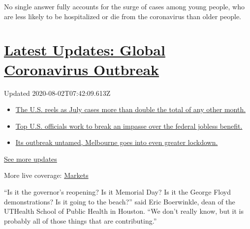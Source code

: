 No single answer fully accounts for the surge of cases among young
people, who are less likely to be hospitalized or die from the
coronavirus than older people.

\hypertarget{latest-updates-global-coronavirus-outbreak}{%
\section{\texorpdfstring{\href{https://www.nytimes.com/2020/08/01/world/coronavirus-covid-19.html?action=click\&pgtype=Article\&state=default\&region=MAIN_CONTENT_1\&context=storylines_live_updates}{Latest
Updates: Global Coronavirus
Outbreak}}{Latest Updates: Global Coronavirus Outbreak}}\label{latest-updates-global-coronavirus-outbreak}}

Updated 2020-08-02T07:42:09.613Z

\begin{itemize}
\tightlist
\item
  \href{https://www.nytimes.com/2020/08/01/world/coronavirus-covid-19.html?action=click\&pgtype=Article\&state=default\&region=MAIN_CONTENT_1\&context=storylines_live_updates\#link-34047410}{The
  U.S. reels as July cases more than double the total of any other
  month.}
\item
  \href{https://www.nytimes.com/2020/08/01/world/coronavirus-covid-19.html?action=click\&pgtype=Article\&state=default\&region=MAIN_CONTENT_1\&context=storylines_live_updates\#link-780ec966}{Top
  U.S. officials work to break an impasse over the federal jobless
  benefit.}
\item
  \href{https://www.nytimes.com/2020/08/01/world/coronavirus-covid-19.html?action=click\&pgtype=Article\&state=default\&region=MAIN_CONTENT_1\&context=storylines_live_updates\#link-2bc8948}{Its
  outbreak untamed, Melbourne goes into even greater lockdown.}
\end{itemize}

\href{https://www.nytimes.com/2020/08/01/world/coronavirus-covid-19.html?action=click\&pgtype=Article\&state=default\&region=MAIN_CONTENT_1\&context=storylines_live_updates}{See
more updates}

More live coverage:
\href{https://www.nytimes.com/live/2020/07/31/business/stock-market-today-coronavirus?action=click\&pgtype=Article\&state=default\&region=MAIN_CONTENT_1\&context=storylines_live_updates}{Markets}

``Is it the governor's reopening? Is it Memorial Day? Is it the George
Floyd demonstrations? Is it going to the beach?'' said Eric Boerwinkle,
dean of the UTHealth School of Public Health in Houston. ``We don't
really know, but it is probably all of those things that are
contributing.''

